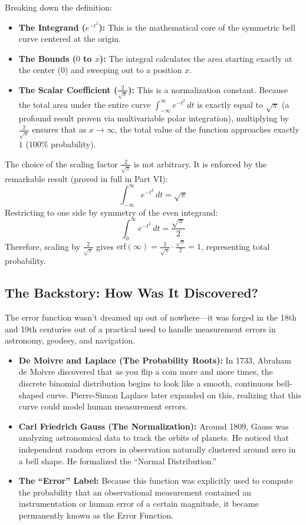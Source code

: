 \documentclass[11pt]{article}
\begin{document}
Breaking down the definition:
\begin{itemize}
    \item \textbf{The Integrand ($e^{-t^2}$):} This is the mathematical core of the symmetric bell curve centered at the origin.
    \item \textbf{The Bounds ($0$ to $x$):} The integral calculates the area starting exactly at the center ($0$) and sweeping out to a position $x$.
    \item \textbf{The Scalar Coefficient ($\frac{2}{\sqrt{\pi}}$):} This is a normalization constant. Because the total area under the entire curve $\int_{-\infty}^{\infty} e^{-t^2} \, dt$ is exactly equal to $\sqrt{\pi}$ (a profound result proven via multivariable polar integration), multiplying by $\frac{2}{\sqrt{\pi}}$ ensures that as $x \to \infty$, the total value of the function approaches exactly $1$ ($100\%$ probability).
\end{itemize}

\begin{theorembox}
The choice of the scaling factor $\frac{2}{\sqrt{\pi}}$ is not arbitrary. It is enforced by the remarkable result (proved in full in Part VI):
\[ \int_{-\infty}^{\infty} e^{-t^2} \, dt = \sqrt{\pi} \]
Restricting to one side by symmetry of the even integrand:
\[ \int_{0}^{\infty} e^{-t^2} \, dt = \frac{\sqrt{\pi}}{2} \]
Therefore, scaling by $\frac{2}{\sqrt{\pi}}$ gives $\text{erf}(\infty) = \frac{2}{\sqrt{\pi}} \cdot \frac{\sqrt{\pi}}{2} = 1$, representing total probability.
\end{theorembox}

\subsection{The Backstory: How Was It Discovered?}

The error function wasn't dreamed up out of nowhere---it was forged in the 18th and 19th centuries out of a practical need to handle measurement errors in astronomy, geodesy, and navigation.

\begin{itemize}
    \item \textbf{De Moivre and Laplace (The Probability Roots):} In 1733, Abraham de Moivre discovered that as you flip a coin more and more times, the discrete binomial distribution begins to look like a smooth, continuous bell-shaped curve. Pierre-Simon Laplace later expanded on this, realizing that this curve could model human measurement errors.
    \item \textbf{Carl Friedrich Gauss (The Normalization):} Around 1809, Gauss was analyzing astronomical data to track the orbits of planets. He noticed that independent random errors in observation naturally clustered around zero in a bell shape. He formalized the ``Normal Distribution.''
    \item \textbf{The ``Error'' Label:} Because this function was explicitly used to compute the probability that an observational measurement contained an instrumentation or human error of a certain magnitude, it became permanently known as the Error Function.
\end{itemize}
\end{document}
